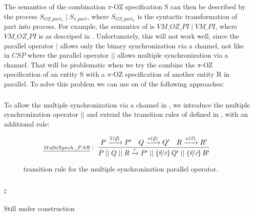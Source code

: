 The semantics of the combination $\pi$-OZ specification S can then be described by the \picalc{} process $S_{OZ\_part_\pi} \mid S_{\pi\_part}$, where $S_{OZ\_part_\pi}$ is the syntactic transformation of \oz{} part into \picalc{} process. For example, the semantics of  is $VM\_OZ\_PI \mid VM\_PI$, where $VM\_OZ\_PI$ is as descriped in . Unfortunately, this will not work well, since the parallel operator $|$ allows only the binary synchronization via a channel, not like in $CSP$ where the parallel operator $||$ allows multiple synchronization via a channel. That will be problematic when we try the combine the $\pi$-OZ specification of an entity S with a $\pi$-OZ specification of another entity R in parallel. To solve this problem we can use on of the following approaches:

\subsubsection{}
To allow the multiple synchronization via a channel in \picalc{}, we introduce the multiple synchronization operator $||$ and extend the
transition rules of \picalc{} defined in , with an additional rule:
\begin{figure}[H]
\begin{gather*}
\kalRuleM[]{MultiSynch\_PAR}{P \transs{\out{x}{\vec{y}}} P'}{Q \transs{\inp{x}{\vec{y}}} Q'}{R \transs{\inp{x}{\vec{z}}} R'}{\procparM{\procparM{P}{Q}}{R} \transs{\tau} 
\procparM{P'}{\procparM{\substitue{\vec{y}}{\vec{z}}Q'}{\substitue{\vec{y}}{\vec{z}}R'}}
}
\end{gather*}
\caption{transition rule for the multiple synchronization parallel operator.}
\label{fig_multiple_synchronization_parallel_operator}
\end{figure}

\subsubsection{:} Still under construction
